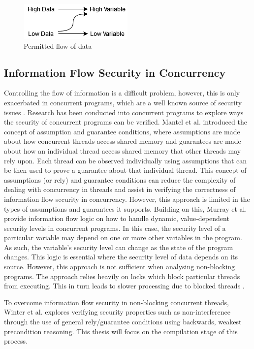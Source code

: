 \documentclass[twocolumn]{article}
\begin{document}
\begin{figure}
    \label{fig:flow}
    \includegraphics{flow.png}
    \caption{Permitted flow of data}
\end{figure}

\subsection{Information Flow Security in Concurrency}
Controlling the flow of information is a difficult problem, however, this is only exacerbated in concurrent programs, which are a well known source of security issues \cite{mantel2014noninterference}\cite{smith2019value}\cite{vaughan2012secure}. Research has been conducted into concurrent programs to explore ways the security of concurrent programs can be verified. Mantel et al. \cite{mantel2011assumptions} introduced the concept of assumption and guarantee conditions, where assumptions are made about how concurrent threads access shared memory and guarantees are made about how an individual thread access shared memory that other threads may rely upon. Each thread can be observed individually using assumptions that can be then used to prove a guarantee about that individual thread. This concept of assumptions (or rely) and guarantee conditions can reduce the complexity of dealing with concurrency in threads and assist in verifying the correctness of information flow security in concurrency. However, this approach is limited in the types of assumptions and guarantees it supports. Building on this, Murray et al. \cite{ernst2019seccsl} \cite{murray2018covern} provide information flow logic on how to handle dynamic, value-dependent security levels in concurrent programs. In this case, the security level of a particular variable may depend on one or more other variables in the program. As such, the variable's security level can change as the state of the program changes. This logic is essential where the security level of data depends on its source. However, this approach is not sufficient when analysing non-blocking programs. The approach relies heavily on locks which block particular threads from executing. This in turn leads to slower processing due to blocked threads \cite{prakash1991non}.

To overcome information flow security in non-blocking concurrent threads, Winter et al. \cite{winter2020information} explores verifying security properties such as non-interference through the use of general rely/guarantee conditions using backwards, weakest precondition reasoning. This thesis will focus on the compilation stage of this process.
\end{document}
